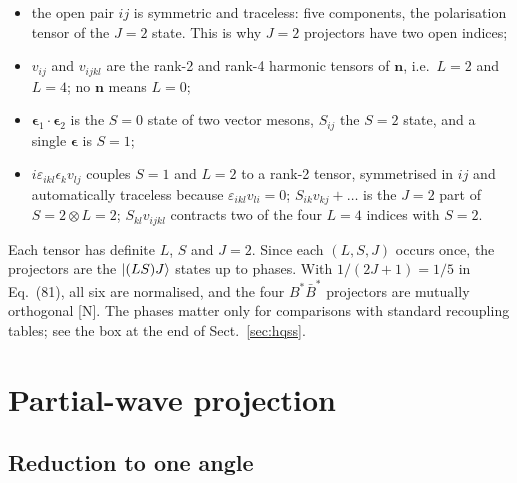 \documentclass[11pt,a4paper]{article}
\newcommand{\tagN}{\textcolor{red!70!black}{\textsf{\small[N]}}}
\newcommand{\BstBst}{B^*\bar B^*}
\newcommand{\vn}{\bm n}
\newcommand{\veps}{\bm\epsilon}
\begin{document}
\begin{itemize}
\item the open pair $ij$ is symmetric and traceless: five components, the polarisation tensor of the $J=2$ state. This is why $J=2$ projectors have two open indices;
\item $v_{ij}$ and $v_{ijkl}$ are the rank-2 and rank-4 harmonic tensors of $\vn$, i.e.\ $L=2$ and $L=4$; no $\vn$ means $L=0$;
\item $\veps_1\cdot\veps_2$ is the $S=0$ state of two vector mesons, $S_{ij}$ the $S=2$ state, and a single $\veps$ is $S=1$;
\item $i\varepsilon_{ikl}\epsilon_kv_{lj}$ couples $S=1$ and $L=2$ to a rank-2 tensor, symmetrised in $ij$ and automatically traceless because $\varepsilon_{ikl}v_{li}=0$; $S_{ik}v_{kj}+\dots$ is the $J=2$ part of $S=2\otimes L=2$; $S_{kl}v_{ijkl}$ contracts two of the four $L=4$ indices with $S=2$.
\end{itemize}
Each tensor has definite $L$, $S$ and $J=2$. Since each $(L,S,J)$ occurs once, the projectors are the $\ket{(LS)J}$ states up to phases. With $1/(2J+1)=1/5$ in Eq.~(81), all six are normalised, and the four $\BstBst$ projectors are mutually orthogonal \tagN. The phases matter only for comparisons with standard recoupling tables; see the box at the end of Sect.~\ref{sec:hqss}.

\section{Partial-wave projection}
\label{sec:method}

\subsection{Reduction to one angle}
\end{document}
